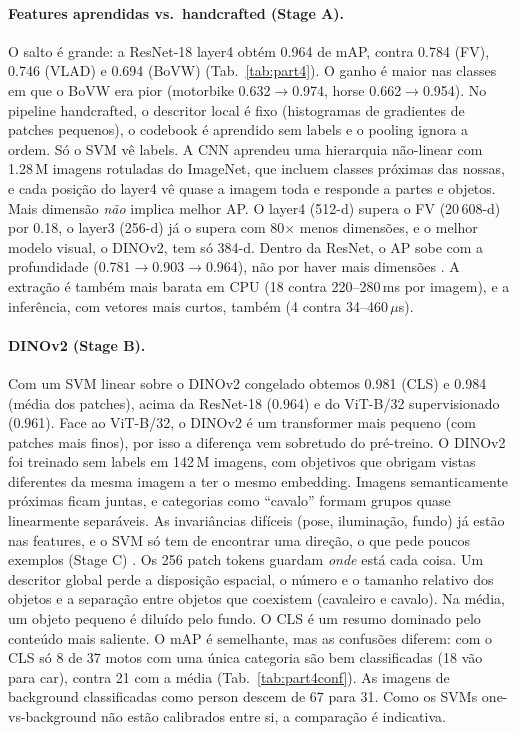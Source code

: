 \paragraph{Features aprendidas vs.\ handcrafted (Stage A).}
O salto é grande: a ResNet-18 layer4 obtém 0.964 de mAP, contra 0.784 (FV),
0.746 (VLAD) e 0.694 (BoVW) (Tab.~\ref{tab:part4}). O ganho é maior nas
classes em que o BoVW era pior (motorbike 0.632$\to$0.974, horse
0.662$\to$0.954). No pipeline handcrafted, o descritor local é fixo
(histogramas de gradientes de patches pequenos), o codebook é aprendido sem
labels e o pooling ignora a ordem. Só o SVM vê labels. A CNN aprendeu uma
hierarquia não-linear com 1.28\,M imagens rotuladas do ImageNet, que incluem
classes próximas das nossas, e cada posição do layer4 vê quase a imagem toda
e responde a partes e objetos. Mais dimensão \emph{não} implica melhor AP. O
layer4 (512-d) supera o FV (20\,608-d) por 0.18, o layer3 (256-d) já o supera
com 80$\times$ menos dimensões, e o melhor modelo visual, o DINOv2, tem só
384-d. Dentro da ResNet, o AP sobe com a profundidade (0.781$\to$0.903$\to$0.964),
não por haver mais dimensões \cite{razavian2014,chatfield2014}. A extração
é também mais barata em CPU (18 contra 220--280\,ms por imagem), e a
inferência, com vetores mais curtos, também (4 contra 34--460\,$\mu$s).

\paragraph{DINOv2 (Stage B).}
Com um SVM linear sobre o DINOv2 congelado obtemos 0.981 (CLS) e 0.984 (média
dos patches), acima da ResNet-18 (0.964) e do ViT-B/32 supervisionado
(0.961). Face ao ViT-B/32, o DINOv2 é um transformer mais pequeno (com
patches mais finos), por isso a diferença vem sobretudo do pré-treino. O DINOv2 foi treinado sem labels em 142\,M imagens, com objetivos
que obrigam vistas diferentes da mesma imagem a ter o mesmo embedding. Imagens
semanticamente próximas ficam juntas, e categorias como ``cavalo'' formam
grupos quase linearmente separáveis. As invariâncias difíceis (pose,
iluminação, fundo) já estão nas features, e o SVM só tem de encontrar uma
direção, o que pede poucos exemplos (Stage C) \cite{oquab2024dinov2,tian2020}.
Os 256 patch tokens guardam \emph{onde} está cada coisa. Um descritor global
perde a disposição espacial, o número e o tamanho relativo dos objetos e a
separação entre objetos que coexistem (cavaleiro e cavalo). Na média, um
objeto pequeno é diluído pelo fundo. O CLS é um resumo dominado pelo conteúdo
mais saliente. O mAP é semelhante, mas as confusões diferem: com o CLS só 8 de
37 motos com uma única categoria são bem classificadas (18 vão para car),
contra 21 com a média (Tab.~\ref{tab:part4conf}). As imagens de background
classificadas como person descem de 67 para 31. Como os SVMs
one-vs-background não estão calibrados entre si, a comparação é indicativa.

